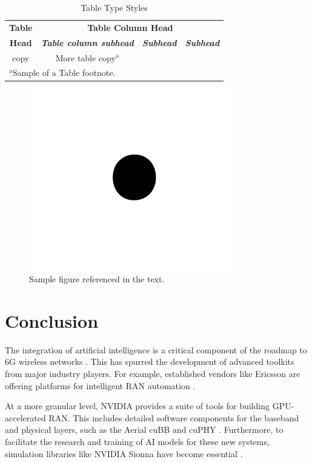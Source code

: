 \documentclass[conference]{IEEEtran}
\begin{document}
\begin{table}[htbp]
\caption{Table Type Styles}
\begin{center}
\begin{tabular}{|c|c|c|c|}
\hline
\textbf{Table}&\multicolumn{3}{|c|}{\textbf{Table Column Head}} \\
\cline{2-4} 
\textbf{Head} & \textbf{\textit{Table column subhead}}& \textbf{\textit{Subhead}}& \textbf{\textit{Subhead}} \\
\hline
copy& More table copy$^{\mathrm{a}}$& &  \\
\hline
\multicolumn{4}{l}{$^{\mathrm{a}}$Sample of a Table footnote.}
\end{tabular}
\label{tab1}
\end{center}
\end{table}

\begin{figure}[htbp]
\centerline{\includegraphics{fig1.png}}
\caption{Sample figure referenced in the text.}
\label{fig}
\end{figure}

\section{Conclusion}
The integration of artificial intelligence is a critical component of the roadmap to 6G wireless networks \cite{letaief_roadmap_2019}. This has spurred the development of advanced toolkits from major industry players. For example, established vendors like Ericsson are offering platforms for intelligent RAN automation \cite{ericsson_iran_2025}.

At a more granular level, NVIDIA provides a suite of tools for building GPU-accelerated RAN. This includes detailed software components for the baseband and physical layers, such as the Aerial cuBB and cuPHY \cite{nvidia_cubb_quickstart_2025, nvidia_cuphy_overview_2025}. Furthermore, to facilitate the research and training of AI models for these new systems, simulation libraries like NVIDIA Sionna have become essential \cite{nvidia_sionna_2025}.

{\color{blue}


}
\end{document}
